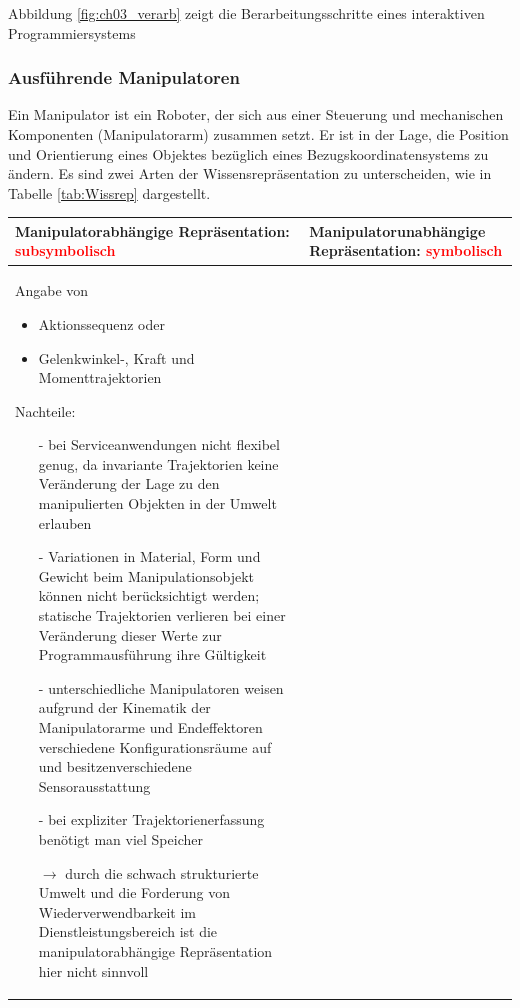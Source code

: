 Abbildung \ref{fig:ch03_verarb} zeigt die Berarbeitungsschritte eines interaktiven Programmiersystems
\subsubsection*{Ausführende Manipulatoren}
Ein Manipulator ist ein Roboter, der sich aus einer Steuerung und mechanischen Komponenten (Manipulatorarm) zusammen setzt. Er ist in der Lage, die Position und Orientierung
eines Objektes bezüglich eines Bezugskoordinatensystems zu ändern.
Es sind zwei Arten der Wissensrepräsentation zu unterscheiden, wie in Tabelle \ref{tab:Wissrep} dargestellt.

\begin{table}[hbt]
\centering
\begin{tabular}{|p{8cm}|p{8cm}|}
\hline
Manipulatorabhängige Repräsentation: \newline \textcolor{red}{subsymbolisch} & Manipulatorunabhängige Repräsentation: \newline \textcolor{red}{symbolisch}\\
\hline
Angabe von
\vspace{-4mm}
\begin{itemize}
\setlength\itemsep{0em}
\item Aktionssequenz oder
\item Gelenkwinkel-, Kraft und Momenttrajektorien
\end{itemize}
Nachteile: 
\begin{itemize}
\setlength\itemsep{0em}
\item[-] bei Serviceanwendungen nicht flexibel genug, da invariante Trajektorien keine Veränderung der Lage zu den manipulierten
Objekten in der Umwelt erlauben
\item[-] Variationen in Material, Form und Gewicht beim Manipulationsobjekt können nicht berücksichtigt werden; statische Trajektorien verlieren bei einer Veränderung dieser Werte zur
Programmausführung ihre Gültigkeit
\item[-] unterschiedliche Manipulatoren weisen aufgrund der Kinematik der Manipulatorarme und Endeffektoren verschiedene Konfigurationsräume auf und besitzenverschiedene Sensorausstattung
\item[-] bei expliziter Trajektorienerfassung benötigt man viel Speicher
\item[$\rightarrow$] durch die schwach strukturierte Umwelt und die Forderung von Wiederverwendbarkeit im Dienstleistungsbereich ist die manipulatorabhängige Repräsentation hier nicht sinnvoll

\end{itemize}
\end{tabular}
\end{table}
